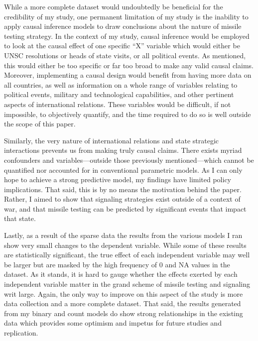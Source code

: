 \documentclass[12pt]{article}
\begin{document}
While a more complete dataset would undoubtedly be beneficial for the credibility of my study, one permanent limitation of my study is the inability to apply causal inference models to draw conclusions about the nature of missile testing strategy. In the context of my study, causal inference would be employed to look at the causal effect of one specific “X” variable which would either be UNSC resolutions or heads of state visits, or all political events. As mentioned, this would either be too specific or far too broad to make any valid causal claims. Moreover, implementing a causal design would benefit from having more data on all countries, as well as information on a whole range of variables relating to political events, military and technological capabilities, and other pertinent aspects of international relations. These variables would be difficult, if not impossible, to objectively quantify, and the time required to do so is well outside the scope of this paper. 

Similarly, the very nature of international relations and state strategic interactions prevents us from making truly causal claims. There exists myriad confounders and variables—outside those previously mentioned—which cannot be quantified nor accounted for in conventional parametric models. As I can only hope to achieve a strong predictive model, my findings have limited policy implications. That said, this is by no means the motivation behind the paper. Rather, I aimed to show that signaling strategies exist outside of a context of war, and that missile testing can be predicted by significant events that impact that state. 

Lastly, as a result of the sparse data the results from the various models I ran show very small changes to the dependent variable. While some of these results are statistically significant, the true effect of each independent variable may well be larger but are masked by the high frequency of 0 and NA values in the dataset. As it stands, it is hard to gauge whether the effects exerted by each independent variable matter in the grand scheme of missile testing and signaling writ large. Again, the only way to improve on this aspect of the study is more data collection and a more complete dataset. That said, the results generated from my binary and count models do show strong relationships in the existing data which provides some optimism and impetus for future studies and replication. 
\end{document}
